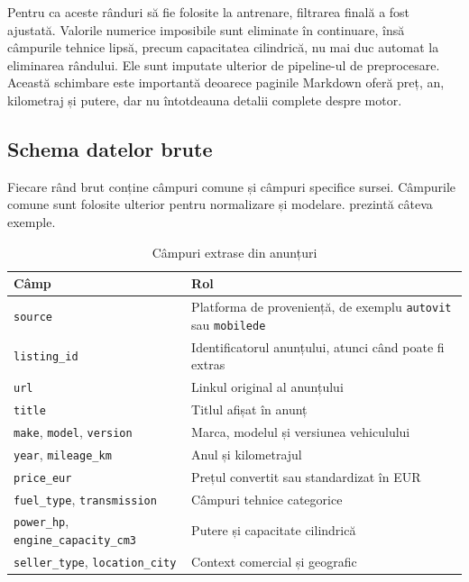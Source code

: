 Pentru ca aceste rânduri să fie folosite la antrenare, filtrarea finală a fost ajustată. Valorile numerice imposibile sunt eliminate în continuare, însă câmpurile tehnice lipsă, precum capacitatea cilindrică, nu mai duc automat la eliminarea rândului. Ele sunt imputate ulterior de pipeline-ul de preprocesare. Această schimbare este importantă deoarece paginile Markdown oferă preț, an, kilometraj și putere, dar nu întotdeauna detalii complete despre motor.

\subsection{Schema datelor brute}
\label{sec:data-schema}

Fiecare rând brut conține câmpuri comune și câmpuri specifice sursei. Câmpurile comune sunt folosite ulterior pentru normalizare și modelare.  prezintă câteva exemple.

\begin{table}[htb]
    \centering
    \small
    \caption{Câmpuri extrase din anunțuri}
    \label{tab:raw-fields}
    \begin{tabular}{@{}p{4.4cm}p{8.0cm}@{}}
        \toprule
        Câmp & Rol \\
        \midrule
        \texttt{source} & Platforma de proveniență, de exemplu \texttt{autovit} sau \texttt{mobilede} \\
        \texttt{listing\_id} & Identificatorul anunțului, atunci când poate fi extras \\
        \texttt{url} & Linkul original al anunțului \\
        \texttt{title} & Titlul afișat în anunț \\
        \texttt{make}, \texttt{model}, \texttt{version} & Marca, modelul și versiunea vehiculului \\
        \texttt{year}, \texttt{mileage\_km} & Anul și kilometrajul \\
        \texttt{price\_eur} & Prețul convertit sau standardizat în EUR \\
        \texttt{fuel\_type}, \texttt{transmission} & Câmpuri tehnice categorice \\
        \texttt{power\_hp}, \texttt{engine\_capacity\_cm3} & Putere și capacitate cilindrică \\
        \texttt{seller\_type}, \texttt{location\_city} & Context comercial și geografic \\
        \bottomrule
    \end{tabular}
\end{table}

